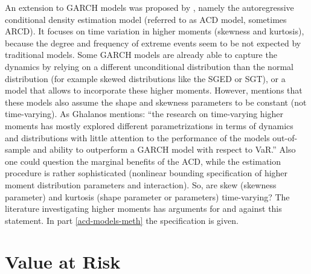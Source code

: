 \documentclass[a4paper, nobind]{templates/ociamthesis}
\begin{document}
\noindent An extension to GARCH models was proposed by \textcite{hansen1994}, namely the autoregressive conditional density estimation model (referred to as ACD model, sometimes ARCD). It focuses on time variation in higher moments (skewness and kurtosis), because the degree and frequency of extreme events seem to be not expected by traditional models. Some GARCH models are already able to capture the dynamics by relying on a different unconditional distribution than the normal distribution (for example skewed distributions like the SGED or SGT), or a model that allows to incorporate these higher moments. However, \textcite{ghalanos2016} mentions that these models also assume the shape and skewness parameters to be constant (not time-varying). As Ghalanos mentions: ``the research on time-varying higher moments has mostly explored different parametrizations in terms of dynamics and distributions with little attention to the performance of the models out-of-sample and ability to outperform a GARCH model with respect to VaR.'' Also one could question the marginal benefits of the ACD, while the estimation procedure is rather sophisticated (nonlinear bounding specification of higher moment distribution parameters and interaction). So, are skew (skewness parameter) and kurtosis (shape parameter or parameters) time-varying? The literature investigating higher moments has arguments for and against this statement. In part \ref{acd-models-meth} the specification is given.

\hypertarget{value-at-risk}{%
\section{Value at Risk}\label{value-at-risk}}
\end{document}
